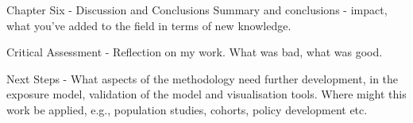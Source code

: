 Chapter Six - Discussion and Conclusions
Summary and conclusions - impact, what you’ve added to the field in terms of new knowledge.

Critical Assessment - Reflection on my work. What was bad, what was good.

Next Steps - What aspects of the methodology need further development, in the exposure model, validation of the model and visualisation tools. Where might this work be applied, e.g., population studies, cohorts, policy development etc.
